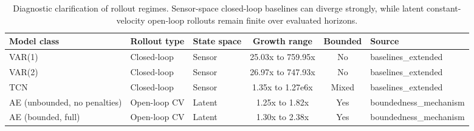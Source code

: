 \begin{table}[t]
\centering
\caption{Diagnostic clarification of rollout regimes. Sensor-space closed-loop baselines can diverge strongly, while latent constant-velocity open-loop rollouts remain finite over evaluated horizons.}
\label{tab:open_vs_closed_loop}
\begin{tabular}{lllccl}
\toprule
Model class & Rollout type & State space & Growth range & Bounded & Source \\
\midrule
VAR(1) & Closed-loop & Sensor & 25.03x to 759.95x & No & baselines\_extended \\
VAR(2) & Closed-loop & Sensor & 26.97x to 747.93x & No & baselines\_extended \\
TCN & Closed-loop & Sensor & 1.35x to 1.27e6x & Mixed & baselines\_extended \\
AE (unbounded, no penalties) & Open-loop CV & Latent & 1.25x to 1.82x & Yes & boundedness\_mechanism \\
AE (bounded, full) & Open-loop CV & Latent & 1.30x to 2.38x & Yes & boundedness\_mechanism \\
\bottomrule
\end{tabular}
\end{table}
